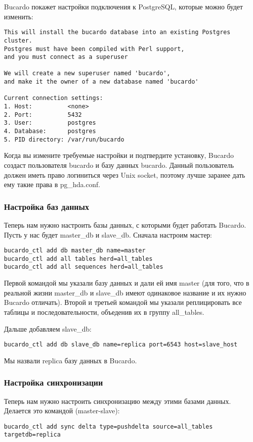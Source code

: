 Bucardo покажет настройки подключения к PostgreSQL, которые можно будет изменить:
\begin{lstlisting}[label=lst:bucardo6,caption=Инициализация Bucardo]
This will install the bucardo database into an existing Postgres cluster.
Postgres must have been compiled with Perl support,
and you must connect as a superuser

We will create a new superuser named 'bucardo',
and make it the owner of a new database named 'bucardo'

Current connection settings:
1. Host:          <none>
2. Port:          5432
3. User:          postgres
4. Database:      postgres
5. PID directory: /var/run/bucardo
\end{lstlisting}

Когда вы измените требуемые настройки и подтвердите установку, Bucardo создаст пользователя bucardo и базу данных bucardo.
Данный пользователь должен иметь право логиниться через Unix socket, поэтому лучше заранее дать ему такие права в pg\_hda.conf.

\subsubsection{Настройка баз данных}
Теперь нам нужно настроить базы данных, с которыми будет работать Bucardo. 
Пусть у нас будет master\_db и slave\_db. Сначала настроим мастер:
\begin{lstlisting}[label=lst:bucardo7,caption=Настройка баз данных]
bucardo_ctl add db master_db name=master
bucardo_ctl add all tables herd=all_tables
bucardo_ctl add all sequences herd=all_tables
\end{lstlisting}

Первой командой мы указали базу данных и дали ей имя master (для того, что в реальной жизни master\_db и slave\_db 
имеют одинаковое название и их нужно Bucardo отличать). Второй и третьей командой мы указали реплицировать все таблицы и последовательности, объеденив их в группу all\_tables.

Дальше добавляем slave\_db:
\begin{lstlisting}[label=lst:bucardo8,caption=Настройка баз данных]
bucardo_ctl add db slave_db name=replica port=6543 host=slave_host
\end{lstlisting}

Мы назвали replica базу данных в Bucardo.

\subsubsection{Настройка синхронизации}
Теперь нам нужно настроить синхронизацию между этими базами данных. Делается это командой (master-slave):
\begin{lstlisting}[label=lst:bucardo9,caption=Настройка синхронизации]
bucardo_ctl add sync delta type=pushdelta source=all_tables targetdb=replica
\end{lstlisting}

